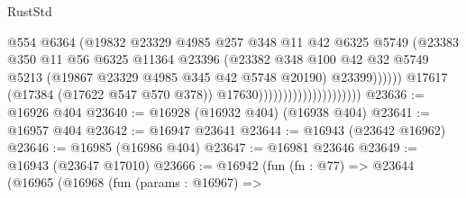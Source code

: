 \begin{lexlean}{RustStd}
\begin{coremodule}
                                                    @554
                                                    @6364
                                                    (@19832
                                                      @23329
                                                      @4985
                                                      @257
                                                      @348
                                                      @11
                                                      @42
                                                      @6325
                                                      @5749
                                                      (@23383
                                                        @350
                                                        @11
                                                        @56
                                                        @6325
                                                        @11364
                                                        @23396
                                                        (@23382
                                                          @348
                                                          @100
                                                          @42
                                                          @32
                                                          @5749
                                                          @5213
                                                          (@19867
                                                            @23329
                                                            @4985
                                                            @345
                                                            @42
                                                            @5748
                                                            @20190)
                                                          @23399))))))
                                              @17617
                                              (@17384 (@17622 @547 @570 @378))
                                              @17630)))))))))))))))))))))
@23636 := @16926 @404
@23640 := @16928 (@16932 @404) (@16938 @404)
@23641 := @16957 @404
@23642 := @16947 @23641
@23644 := @16943 (@23642 @16962)
@23646 := @16985 (@16986 @404)
@23647 := @16981 @23646
@23649 := @16943 (@23647 @17010)
@23666 := @16942
    (fun (fn : @77) =>
    @23644
      (@16965
        (@16968
          (fun (params : @16967) =>

\end{coremodule}
\end{lexlean}
